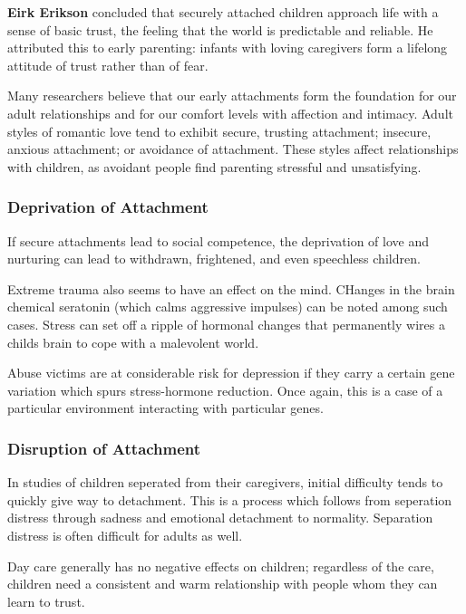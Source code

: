 \documentclass[12pt]{article}
\begin{document}
{\bf Eirk Erikson} concluded that securely attached children approach life with a sense of basic trust, the feeling that the world is predictable and reliable. He attributed this to early parenting: infants with loving caregivers form a lifelong attitude of trust rather than of fear.

Many researchers believe that our early attachments form the foundation for our adult relationships and for our comfort levels with affection and intimacy. Adult styles of romantic love tend to exhibit secure, trusting attachment; insecure, anxious attachment; or avoidance of attachment. These styles affect relationships with children, as avoidant people find parenting stressful and unsatisfying.

\subsubsection*{Deprivation of Attachment}
If secure attachments lead to social competence, the deprivation of love and nurturing can lead to withdrawn, frightened, and even speechless children.

Extreme trauma also seems to have an effect on the mind. CHanges in the brain chemical seratonin (which calms aggressive impulses) can be noted among such cases. Stress can set off a ripple of hormonal changes that permanently wires a childs brain to cope with a malevolent world.

Abuse victims are at considerable risk for depression if they carry a certain gene variation which spurs stress-hormone reduction. Once again, this is a case of a particular environment interacting with particular genes.

\subsubsection*{Disruption of Attachment}
In studies of children seperated from their caregivers, initial difficulty tends to quickly give way to detachment. This is a process which follows from seperation distress through sadness and emotional detachment to normality. Separation distress is often difficult for adults as well.

Day care generally has no negative effects on children; regardless of the care, children need a consistent and warm relationship with people whom they can learn to trust.
\end{document}
